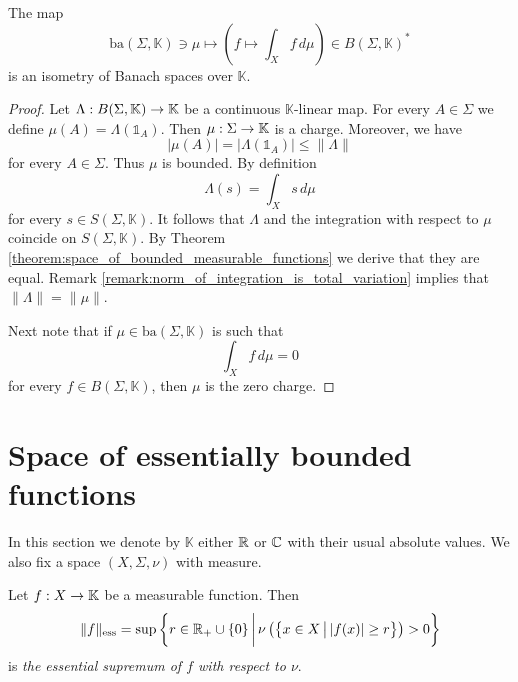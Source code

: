 \begin{theorem}\label{theorem:fichtenholz_kantorovich_for_bounded_functions}
    The map
    $$\mathrm{ba}(\Sigma,\mathbb{K})\ni \mu \mapsto \left(f\mapsto \int_Xf\,d\mu\right) \in B(\Sigma,\mathbb{K})^*$$
    is an isometry of Banach spaces over $\mathbb{K}$.
\end{theorem}
\begin{proof}
    Let $\Lambda:B(\Sigma,\mathbb{K})\rightarrow \mathbb{K}$ be a continuous $\mathbb{K}$-linear map. For every $A \in \Sigma$ we define $\mu(A) = \Lambda(\mathbb{1}_A)$. Then $\mu:\Sigma \rightarrow \mathbb{K}$ is a charge. Moreover, we have
    $$|\mu(A)| = \big|\Lambda(\mathbb{1}_A)\big| \leq \lVert \Lambda \rVert$$
    for every $A \in \Sigma$. Thus $\mu$ is bounded. By definition
    $$\Lambda(s) = \int_Xs\,d\mu$$
    for every $s \in S(\Sigma,\mathbb{K})$. It follows that $\Lambda$ and the integration with respect to $\mu$ coincide on $S(\Sigma,\mathbb{K})$. By Theorem \ref{theorem:space_of_bounded_measurable_functions} we derive that they are equal. Remark \ref{remark:norm_of_integration_is_total_variation} implies that $\lVert \Lambda \rVert = \lVert \mu \rVert$.

    Next note that if $\mu \in \mathrm{ba}(\Sigma,\mathbb{K})$ is such that
    $$\int_Xf\,d\mu = 0$$
    for every $f \in B(\Sigma,\mathbb{K})$, then $\mu$ is the zero charge.
\end{proof}

\section{Space of essentially bounded functions}
\noindent
In this section we denote by $\mathbb{K}$ either ${\mathbb R}$ or ${\mathbb C}$ with their usual absolute values. We also fix a space $(X,\Sigma,\nu)$ with measure.

\begin{definition}
    Let $f:X\rightarrow \mathbb{K}$ be a measurable function. Then
    $$\lVert f \rVert_{\mathrm{ess}} = \sup \bigg\{r\in {\mathbb R}_+\cup \{0\}\,\bigg|\,\nu\left(\big\{x\in X\,\big|\,|f(x)| \geq r\big\}\right) > 0\bigg\}$$
    is \textit{the essential supremum of $f$ with respect to $\nu$}.
\end{definition}

